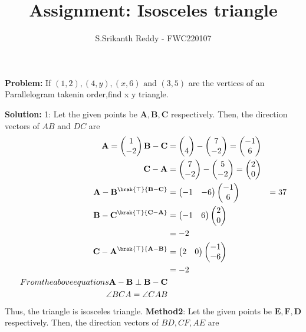 \documentclass{article}
\newcommand{\myvec}[1]{\ensuremath{\begin{pmatrix}#1\end{pmatrix}}}
\let\vec\mathbf
\newcommand{\Problem}{\noindent \textbf{Problem: }}
\newcommand{\solution}{\noindent \textbf{Solution: }}
\begin{document}
\title{Assignment: Isosceles triangle}
\author{\Large S.Srikanth Reddy - FWC220107}
\date{}
\maketitle
\Problem If $(1,2),(4,y),(x,6) \text{ and } (3,5)$ are the vertices of an Parallelogram takenin order,find x  y triangle.
\begin{table}[h!]
	\small
	\centering
     
	\label{table:12table1}
	\end{table}
\solution 1:
Let the given points be $\vec{A}, \vec{B}, \vec{C}$ respectively. 
Then, the direction vectors of $AB$ and $DC$ are
\begin{align}
\vec{A}=\myvec{1 \\ -2}
\vec{B}-\vec{C}&=\myvec{\\4}-\myvec{7\\-2}=\myvec{-1\\6}\\
\vec{C}-\vec{A}&=\myvec{7\\-2}-\myvec{5\\-2}=\myvec{2\\0}\\
{\vec{A}-\vec{B}}^\brak{\top}{\vec{B}-\vec{C}}&=\myvec{-1 & -6}\myvec{-1 \\ 6}\
&=37\\
{\vec{B}-\vec{C}}^\brak{\top}{\vec{C}-\vec{A}}&=\myvec{-1 & 6}\myvec{2 \\ 0}\\
&=-2\\
{\vec{C}-\vec{A}}^\brak{\top}{\vec{A}-\vec{B}}&=\myvec{2 & 0}\myvec{-1 \\ -6}\\
&=-2\\
From  the above equations
{\vec{A} -\vec{B}}\perp {\vec{B} -\vec{C}}\\
\angle BCA = \angle CAB 
\end{align}
Thus, the triangle is isosceles triangle.
\textbf{Method2}: Let the given points be $\vec{E}, \vec{F}, \vec{D}$ respectively. 
 Then, the direction vectors of  $BD ,CF,AE$ are
\end{document}
